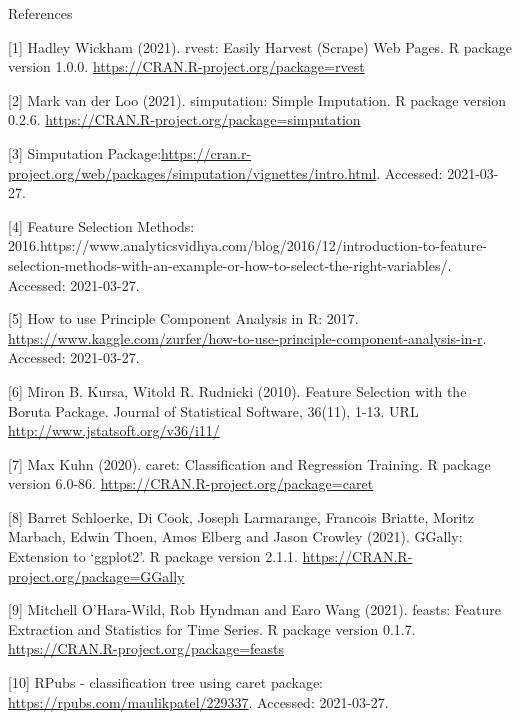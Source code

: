 \documentclass[12pt,ignorenonframetext,]{beamer}
\begin{document}
\begin{frame}{References}
\protect\hypertarget{references}{}

\tiny

{[}1{]} Hadley Wickham (2021). rvest: Easily Harvest (Scrape) Web Pages.
R package version 1.0.0. \url{https://CRAN.R-project.org/package=rvest}

{[}2{]} Mark van der Loo (2021). simputation: Simple Imputation. R
package version 0.2.6.
\url{https://CRAN.R-project.org/package=simputation}

{[}3{]} Simputation
Package:\url{https://cran.r-project.org/web/packages/simputation/vignettes/intro.html}.
Accessed: 2021-03-27.

{[}4{]} Feature Selection Methods:
2016.https://www.analyticsvidhya.com/blog/2016/12/introduction-to-feature-selection-methods-with-an-example-or-how-to-select-the-right-variables/.
Accessed: 2021-03-27.

{[}5{]} How to use Principle Component Analysis in R: 2017.
\url{https://www.kaggle.com/zurfer/how-to-use-principle-component-analysis-in-r}.
Accessed: 2021-03-27.

{[}6{]} Miron B. Kursa, Witold R. Rudnicki (2010). Feature Selection
with the Boruta Package. Journal of Statistical Software, 36(11), 1-13.
URL \url{http://www.jstatsoft.org/v36/i11/}

{[}7{]} Max Kuhn (2020). caret: Classification and Regression Training.
R package version 6.0-86. \url{https://CRAN.R-project.org/package=caret}

{[}8{]} Barret Schloerke, Di Cook, Joseph Larmarange, Francois Briatte,
Moritz Marbach, Edwin Thoen, Amos Elberg and Jason Crowley (2021).
GGally: Extension to `ggplot2'. R package version 2.1.1.
\url{https://CRAN.R-project.org/package=GGally}

{[}9{]} Mitchell O'Hara-Wild, Rob Hyndman and Earo Wang (2021). feasts:
Feature Extraction and Statistics for Time Series. R package version
0.1.7. \url{https://CRAN.R-project.org/package=feasts}

{[}10{]} RPubs - classification tree using caret package:
\url{https://rpubs.com/maulikpatel/229337}. Accessed: 2021-03-27.

\end{frame}
\end{document}
